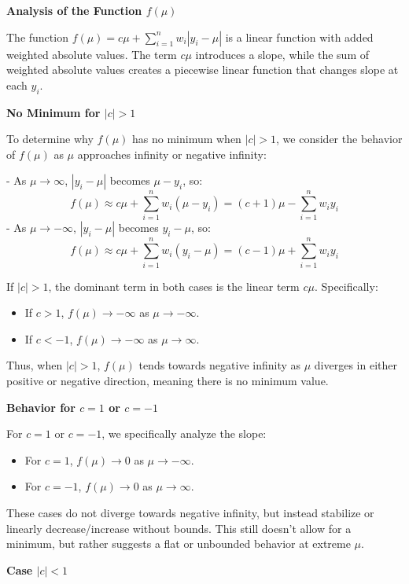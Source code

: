 \documentclass[8pt]{article}
\begin{document}
\textbf{Analysis of the Function \( f(\mu) \)}

The function \( f(\mu) = c\mu + \sum_{i=1}^{n} w_i |y_i - \mu| \) is a linear function with added weighted absolute values. The term \( c\mu \) introduces a slope, while the sum of weighted absolute values creates a piecewise linear function that changes slope at each \( y_i \).

\textbf{No Minimum for \( |c| > 1 \)}

To determine why \( f(\mu) \) has no minimum when \( |c| > 1 \), we consider the behavior of \( f(\mu) \) as \( \mu \) approaches infinity or negative infinity:

- As \( \mu \to \infty \), \( |y_i - \mu| \) becomes \( \mu - y_i \), so:
  \[
  f(\mu) \approx c\mu + \sum_{i=1}^{n} w_i (\mu - y_i) = (c + 1)\mu - \sum_{i=1}^{n} w_i y_i
  \]
- As \( \mu \to -\infty \), \( |y_i - \mu| \) becomes \( y_i - \mu \), so:
  \[
  f(\mu) \approx c\mu + \sum_{i=1}^{n} w_i (y_i - \mu) = (c - 1)\mu + \sum_{i=1}^{n} w_i y_i
  \]

If \( |c| > 1 \), the dominant term in both cases is the linear term \( c\mu \). Specifically:
\begin{itemize}
    \item If \( c > 1 \), \( f(\mu) \to -\infty \) as \( \mu \to -\infty \).
    \item If \( c < -1 \), \( f(\mu) \to -\infty \) as \( \mu \to \infty \).
\end{itemize}

Thus, when \( |c| > 1 \), \( f(\mu) \) tends towards negative infinity as \( \mu \) diverges in either positive or negative direction, meaning there is no minimum value.

\textbf{Behavior for \( c = 1 \) or \( c = -1 \)}

For \( c = 1 \) or \( c = -1 \), we specifically analyze the slope:
\begin{itemize}
    \item For \( c = 1 \), \( f(\mu) \to 0 \) as \( \mu \to -\infty \).
    \item For \( c = -1 \), \( f(\mu) \to 0 \) as \( \mu \to \infty \).
\end{itemize}

These cases do not diverge towards negative infinity, but instead stabilize or linearly decrease/increase without bounds. This still doesn't allow for a minimum, but rather suggests a flat or unbounded behavior at extreme \( \mu \).

\textbf{Case \( |c| < 1 \)}
\end{document}
